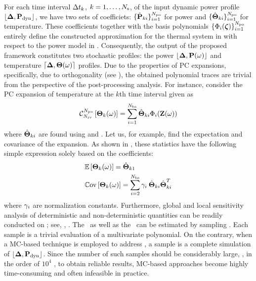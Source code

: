 For each time interval $\Delta t_k$, $k = 1, \dotsc, N_\text{s}$, of the input dynamic power profile $\profPdyn$, we have two sets of coefficiets: $\{ \hat{\mathbf{P}}_{ki} \}_{i = 1}^{{N_\text{po}}}$ for power and $\{ \hat{{\boldsymbol\Theta}}_{ki} \}_{i = 1}^{{N_\text{po}}}$ for temperature. These coefficients together with the basis polynomials $\{ \Phi_i(\boldsymbol{\zeta}) \}_{i = 1}^{{N_\text{po}}}$ entirely define the constructed approximation for the thermal system in  with respect to the power model in . Consequently, the output of the proposed framework constitutes two stochastic profiles: the power $\profP{\o}$ and temperature $\profT{\o}$ profiles. Due to the properties of PC expansions, specifically, due to orthogonality (see ), the obtained polynomial traces are trivial from the perspective of the post-processing analysis. For instance, consider the PC expansion of temperature at the $k$th time interval given as
\begin{equation} \elabel{pc-k}
  \oPC{\vars}{\pcorder}{\vTO_k(\o)} = \sum_{i = 1}^{\pcterms} \pcc{\vTO}_{ki} \pcb_i(\vZ(\o))
\end{equation}
where $\hat{{\boldsymbol\Theta}}_{ki}$ are found using  and . Let us, for example, find the expectation and covariance of the expansion. As shown in , these statistics have the following simple expression solely based on the coefficients:
\begin{align*}
  & \mathbb{E}\left[{\boldsymbol\Theta}_k(\omega)\right] = \hat{{\boldsymbol\Theta}}_{k1} \\
  & \mathbb{C}\text{ov}\left[{\boldsymbol\Theta}_k(\omega)\right] = \sum_{i = 2}^{{N_\text{bs}}} \gamma_i \: \hat{{\boldsymbol\Theta}}_{ki} \hat{{\boldsymbol\Theta}}_{ki}^T
\end{align*}
where $\gamma_i$ are normalization constants. Furthermore, global and local sensitivity analysis of deterministic and non-deterministic quantities can be readily conducted on ; see, \eg, \cite{eldred2009, maitre2010}. The \cdf\ as well as the \pdf\ can be estimated by sampling . Each sample is a trivial evaluation of a multivariate polynomial. On the contrary, when a MC-based technique is employed to address , a sample is a complete simulation of $\profPdyn$. Since the number of such samples should be considerably large, \eg, in the order of $10^4$ \cite{xiu2010}, to obtain reliable results, MC-based approaches become highly time-consuming and often infeasible in practice.
